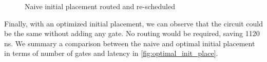 \begin{figure}[H]
\centering


\label{fig:map_ex_resch}
\caption{Naive initial placement routed and re-scheduled}
\end{figure}
Finally, with an optimized initial placement, we can observe that the circuit could be the same without adding any gate.
No routing would be required, saving 1120 ns.
We summary a comparison between the naive and optimal initial placement in terms of number of gates and latency in \ref{fig:optimal_init_place}.


